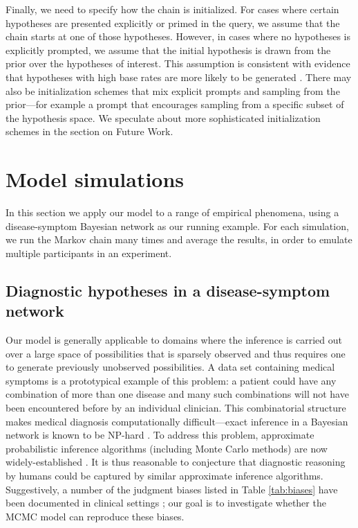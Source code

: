 Finally, we need to specify how the chain is initialized. For cases where certain hypotheses are presented explicitly or primed in the query, we assume that the chain starts at one of those hypotheses. However, in cases where no hypotheses is explicitly prompted, we assume that the initial hypothesis is drawn from the prior over the hypotheses of interest. This assumption is consistent with evidence that hypotheses with high base rates are more likely to be generated \citep{weber1993}. There may also be initialization schemes that mix explicit prompts and sampling from the prior---for example a prompt that encourages sampling from a specific subset of the hypothesis space. We speculate about more sophisticated initialization schemes in the section on Future Work.
\section{Model simulations}

In this section we apply our model to a range of empirical phenomena, using a disease-symptom Bayesian network as our running example. For each simulation, we run the Markov chain many times and average the results, in order to emulate multiple participants in an experiment.

\subsection{Diagnostic hypotheses in a disease-symptom network}

Our model is generally applicable to domains where the inference is carried out over a large space of possibilities that is sparsely observed and thus requires one to generate previously unobserved possibilities. A data set containing medical symptoms is a prototypical example of this problem: a patient could have any combination of more than one disease and many such combinations will not have been encountered before by an individual clinician. This combinatorial structure makes medical diagnosis computationally difficult---exact inference in a Bayesian network is known to be NP-hard \citep{cooper1990complexity}. To address this problem, approximate probabilistic inference algorithms (including Monte Carlo methods) are now widely-established \citep[e.g.,][]{Shwe1991, Jaakkola1999, Heckerman1990}. It is thus reasonable to conjecture that diagnostic reasoning by humans could be captured by similar approximate inference algorithms. Suggestively, a number of the judgment biases listed in Table \ref{tab:biases} have been documented in clinical settings \citep{redelmeier1995probability,elstein1978medical,weber1993}; our goal is to investigate whether the MCMC model can reproduce these biases.

